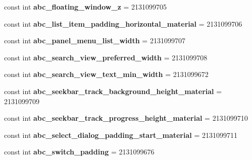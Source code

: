 \begin{DoxyCompactItemize}
const int {\bfseries abc\+\_\+floating\+\_\+window\+\_\+z} = 2131099705
\item 
\mbox{\label{classXaria_1_1Resource_1_1Dimension_a9b36473038b0bebac31dce18fc268db2}} 
const int {\bfseries abc\+\_\+list\+\_\+item\+\_\+padding\+\_\+horizontal\+\_\+material} = 2131099706
\item 
\mbox{\label{classXaria_1_1Resource_1_1Dimension_af1c6c63f3b8d90e2c8d30b21bed6322f}} 
const int {\bfseries abc\+\_\+panel\+\_\+menu\+\_\+list\+\_\+width} = 2131099707
\item 
\mbox{\label{classXaria_1_1Resource_1_1Dimension_a89a7935c47ad24aaad47ee9573363c28}} 
const int {\bfseries abc\+\_\+search\+\_\+view\+\_\+preferred\+\_\+width} = 2131099708
\item 
\mbox{\label{classXaria_1_1Resource_1_1Dimension_adb05cdc17e7959a12527d9b7c4de3ef3}} 
const int {\bfseries abc\+\_\+search\+\_\+view\+\_\+text\+\_\+min\+\_\+width} = 2131099672
\item 
\mbox{\label{classXaria_1_1Resource_1_1Dimension_af33db69ebce5b121f84e22445f1f1080}} 
const int {\bfseries abc\+\_\+seekbar\+\_\+track\+\_\+background\+\_\+height\+\_\+material} = 2131099709
\item 
\mbox{\label{classXaria_1_1Resource_1_1Dimension_a04e5c44a27e9a34a0de155fb2815d05f}} 
const int {\bfseries abc\+\_\+seekbar\+\_\+track\+\_\+progress\+\_\+height\+\_\+material} = 2131099710
\item 
\mbox{\label{classXaria_1_1Resource_1_1Dimension_aad67b24a32f18f9a2d6e751846a60c70}} 
const int {\bfseries abc\+\_\+select\+\_\+dialog\+\_\+padding\+\_\+start\+\_\+material} = 2131099711
\item 
\mbox{\label{classXaria_1_1Resource_1_1Dimension_a4b478aa0d5b33ba1d022da17be61f3b4}} 
const int {\bfseries abc\+\_\+switch\+\_\+padding} = 2131099676
\item 
\mbox{\label{classXaria_1_1Resource_1_1Dimension_a8e274b8d7531111a13375d778707789b}} 

\end{DoxyCompactItemize}
